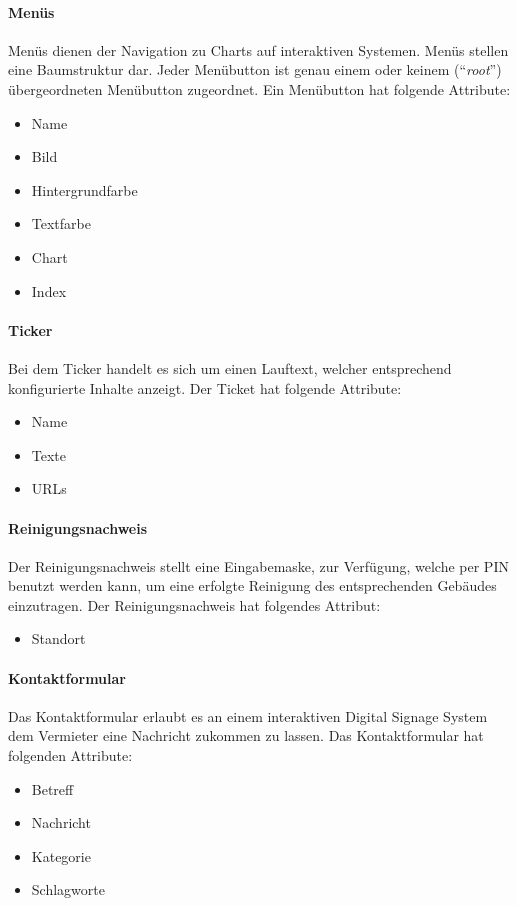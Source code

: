 \documentclass[a4paper]{article}
\begin{document}
	\paragraph{Menüs}
	Menüs dienen der Navigation zu Charts auf interaktiven Systemen.
	Menüs stellen eine Baumstruktur dar. Jeder Menübutton ist genau einem oder keinem (\enquote{\emph{root}}) übergeordneten Menübutton zugeordnet.
	Ein Menübutton hat folgende Attribute:
	\begin{itemize}
	\item Name
	\item Bild
	\item Hintergrundfarbe
	\item Textfarbe
	\item Chart
	\item Index
	\end{itemize}
	\paragraph{Ticker}
	Bei dem Ticker handelt es sich um einen Lauftext, welcher entsprechend konfigurierte Inhalte anzeigt.
	Der Ticket hat folgende Attribute:
	\begin{itemize}
	\item Name
	\item Texte
	\item URLs
	\end{itemize}
	\paragraph{Reinigungsnachweis}
	Der Reinigungsnachweis stellt eine Eingabemaske, zur Verfügung, welche per PIN benutzt werden kann, um eine erfolgte Reinigung des entsprechenden Gebäudes einzutragen.
	Der Reinigungsnachweis hat folgendes Attribut:
	\begin{itemize}
	\item Standort
	\end{itemize}
	\paragraph{Kontaktformular}
	Das Kontaktformular erlaubt es an einem interaktiven Digital Signage System dem Vermieter eine Nachricht zukommen zu lassen.
	Das Kontaktformular hat folgenden Attribute:
	\begin{itemize}
	\item Betreff
	\item Nachricht
	\item Kategorie
	\item Schlagworte
	\end{itemize}
\end{document}
